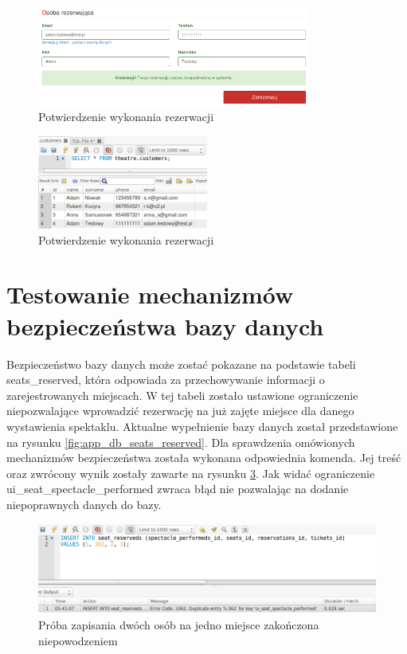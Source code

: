\documentclass{mgr}
\begin{document}
\begin{figure}[!ht]
	\centering
	\includegraphics[width=0.8\textwidth]{images/app_reservation_success.png}
	\caption{Potwierdzenie wykonania rezerwacji}
	\label{fig:app-reservation-success}
\end{figure}

\begin{figure}[!ht]
	\centering
	\includegraphics[width=0.5\textwidth]{images/app_db_show_clients.png}
	\caption{Potwierdzenie wykonania rezerwacji}
	\label{fig:app-db-show-clients}
\end{figure}


\section{Testowanie mechanizmów bezpieczeństwa bazy danych}
Bezpieczeństwo bazy danych może zostać pokazane na podstawie tabeli seats\_reserved, która odpowiada za przechowywanie informacji o zarejestrowanych miejscach. W tej tabeli zostało ustawione ograniczenie niepozwalające wprowadzić rezerwację na już zajęte miejsce dla danego wystawienia spektaklu. Aktualne wypełnienie bazy danych został przedstawione na rysunku \ref{fig:app_db_seats_reserved}. Dla sprawdzenia omówionych mechanizmów bezpieczeństwa została wykonana odpowiednia komenda. Jej treść oraz zwrócony wynik zostały zawarte na rysunku \ref{fig:app_db_insert_fail}. Jak widać ograniczenie ui\_seat\_spectacle\_performed zwraca błąd nie pozwalając na dodanie niepoprawnych danych do bazy.




\begin{figure}[!ht]
	\centering
	\includegraphics[width=\textwidth]{images/app_db_insert_fail.png}
	\caption{Próba zapisania dwóch osób na jedno miejsce zakończona niepowodzeniem}
	\label{fig:app_db_insert_fail}
\end{figure}
\end{document}
